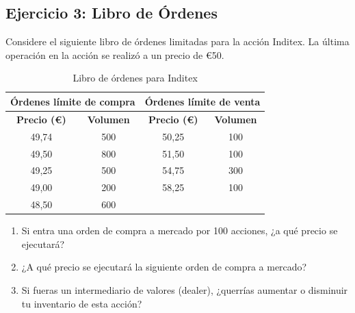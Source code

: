 \subsection{Ejercicio 3: Libro de Órdenes}

\begin{ejercicio}
Considere el siguiente libro de órdenes limitadas para la acción Inditex. La última operación en la acción se realizó a un precio de €50.

\begin{table}[h]
\centering
\begin{tabular}{|c|c||c|c|}
\hline
\multicolumn{2}{|c||}{\textbf{Órdenes límite de compra}} & \multicolumn{2}{c|}{\textbf{Órdenes límite de venta}} \\
\hline
\textbf{Precio (€)} & \textbf{Volumen} & \textbf{Precio (€)} & \textbf{Volumen} \\
\hline
49,74 & 500 & 50,25 & 100 \\
49,50 & 800 & 51,50 & 100 \\
49,25 & 500 & 54,75 & 300 \\
49,00 & 200 & 58,25 & 100 \\
48,50 & 600 & & \\
\hline
\end{tabular}
\caption{Libro de órdenes para Inditex}
\end{table}

\begin{enumerate}
\item Si entra una orden de compra a mercado por 100 acciones, ¿a qué precio se ejecutará?
\item ¿A qué precio se ejecutará la siguiente orden de compra a mercado?
\item Si fueras un intermediario de valores (dealer), ¿querrías aumentar o disminuir tu inventario de esta acción?
\end{enumerate}
\end{ejercicio}

